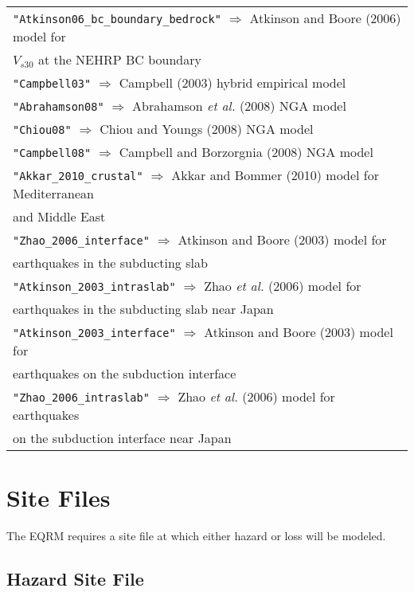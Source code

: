 \begin{tabular}{|p{\textwidth}|}
\texttt{"Atkinson06\_bc\_boundary\_bedrock"} $\Rightarrow$ Atkinson and Boore (2006) model for \\
\hspace{8em} $V_{s30}$ at the NEHRP BC boundary\\
\texttt{"Campbell03"} $\Rightarrow$ Campbell (2003) hybrid empirical model\\
\texttt{"Abrahamson08"} $\Rightarrow$ Abrahamson \textit{et al.} (2008) NGA model\\
\texttt{"Chiou08"} $\Rightarrow$ Chiou and Youngs (2008) NGA model \\
\texttt{"Campbell08"} $\Rightarrow$ Campbell and Borzorgnia (2008) NGA model \\
\texttt{"Akkar\_2010\_crustal"} $\Rightarrow$ Akkar and Bommer (2010) model for Mediterranean \\
    \hspace{8em} and Middle East\\
\texttt{"Zhao\_2006\_interface"} $\Rightarrow$ Atkinson and Boore (2003) model for \\
    \hspace{8em} earthquakes in the subducting slab \\
\texttt{"Atkinson\_2003\_intraslab"} $\Rightarrow$ Zhao \textit{et al.} (2006) model for \\
    \hspace{8em} earthquakes in the subducting slab near Japan\\
\texttt{"Atkinson\_2003\_interface"} $\Rightarrow$ Atkinson and Boore (2003) model for \\
    \hspace{8em} earthquakes on the subduction interface\\
\texttt{"Zhao\_2006\_intraslab"} $\Rightarrow$ Zhao \textit{et al.} (2006) model for earthquakes \\
    \hspace{8em} on the subduction interface near Japan \\
\hline
\end{tabular}



\section{Site Files}


The EQRM requires a site file at which either hazard or loss will be modeled.

\subsection{Hazard Site File}

